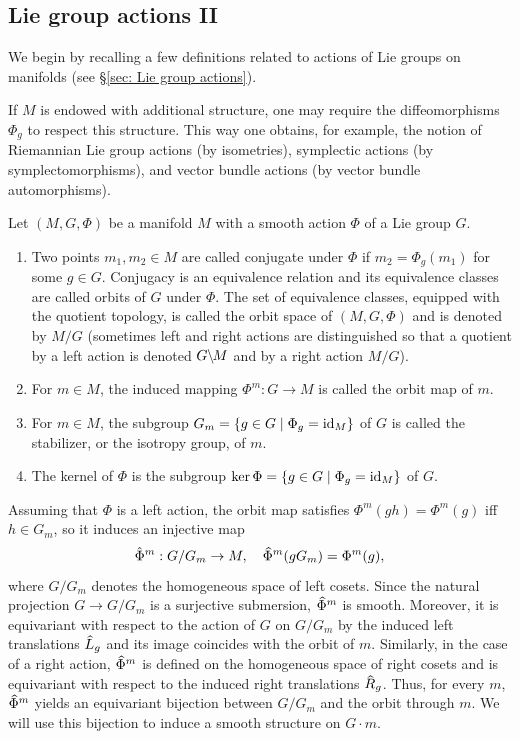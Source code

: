 \subsection{Lie group actions II}

We begin by recalling a few definitions related to actions of Lie groups on manifolds (see \S\ref{sec: Lie group actions}).


\begin{rem}
    If $M$ is endowed with additional structure, one may require the diffeomorphisms $\Phi_g$ to respect this structure. This way one obtains, for example, the notion of Riemannian Lie group actions (by isometries), symplectic actions (by symplectomorphisms), and vector bundle actions (by vector bundle automorphisms).
\end{rem}


\begin{defn}
    Let $(M,G,\Phi)$ be a manifold $M$ with a smooth action $\Phi$ of a Lie group $G$. 
    \begin{enumerate}
        \item Two points $m_1,m_2\in M$ are called conjugate under $\Phi$ if $m_2=\Phi_g(m_1)$ for some $g\in G$. Conjugacy is an equivalence relation and its equivalence classes are called orbits of $G$ under $\Phi$. The set of equivalence classes, equipped with the quotient topology, is called the orbit space of $(M,G,\Phi)$ and is denoted by $M\slash G$ (sometimes left and right actions are distinguished so that a quotient by a left action is denoted $G\mkern-.5mu\backslash\mkern-2mu M$ and by a right action $M\slash G$).
        \item For $m\in M$, the induced mapping $\Phi^m:G\to M$ is called the orbit map of $m$.
        \item For $m\in M$, the subgroup $G_m=\{g\in G\mid \Phi_g=\operatorname{id}_M\}$ of $G$ is called the stabilizer, or the isotropy group, of $m$.
        \item The kernel of $\Phi$ is the subgroup $\ker\Phi=\{g\in G\mid \Phi_g=\operatorname{id}_M\}$ of $G$.
    \end{enumerate}
\end{defn}

Assuming that $\Phi$ is a left action, the orbit map satisfies $\Phi^m(gh)=\Phi^m(g)$ iff $h\in G_m$, so it induces an injective map
\[\hat{\Phi}^m:G\slash G_m\to M,\quad \wh{\Phi}^m(g G_m)=\Phi^m(g),\label{eq 6.1.8 RS1}\]
where $G\slash G_m$ denotes the homogeneous space of left cosets. Since the natural projection $G\to G\slash G_m$ is a surjective submersion, $\wh{\Phi}^m$ is smooth. Moreover, it is equivariant with respect to the action of $G$ on $G\slash G_m$ by the induced left translations $\wh{L}_g$ and its image coincides with the orbit of $m$. Similarly, in the case of a right action, $\wh{\Phi}^m$ is defined on the homogeneous space of right cosets and is equivariant with respect to the induced right translations $\wh{R}_g$. Thus, for every $m$, $\wh{\Phi}^m$ yields an equivariant bijection between $G\slash G_m$ and the orbit through $m$. We will use this bijection to induce a smooth structure on $G\cdot m$.


